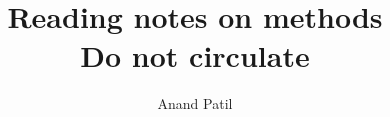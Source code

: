 \documentclass[a4paper]{article}
\begin{document}
\title{Reading notes on methods\\ Do not circulate}
\author{Anand Patil}
\maketitle

\tableofcontents 




 
 
\end{document}
